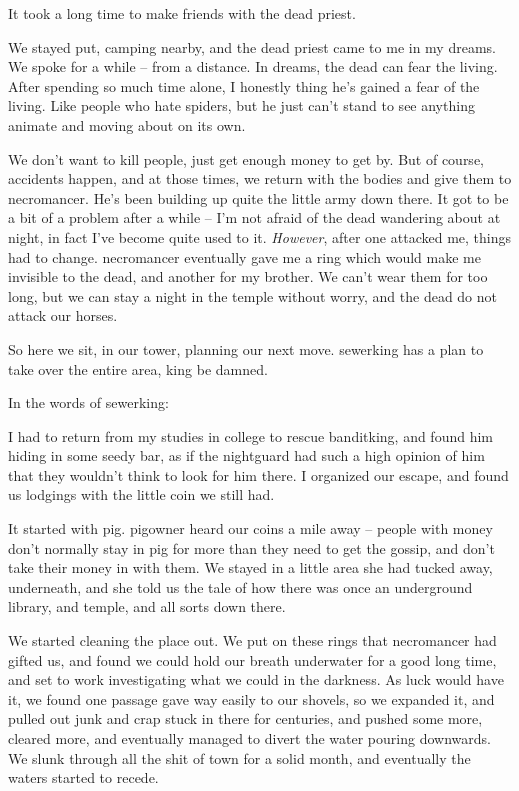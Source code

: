 \begin{multicols}{2}
\begin{exampletext}
  It took a long time to make friends with the dead priest.

  We stayed put, camping nearby, and the dead priest came to me in my dreams.
  We spoke for a while -- from a distance.
  In dreams, the dead can fear the living.
  After spending so much time alone, I honestly thing he's gained a fear of the living.
  Like people who hate spiders, but he just can't stand to see anything animate and moving about on its own.

  We don't want to kill people, just get enough money to get by.
  But of course, accidents happen, and at those times, we return with the bodies and give them to \gls{necromancer}.
  He's been building up quite the little army down there.
  It got to be a bit of a problem after a while -- I'm not afraid of the dead wandering about at night, in fact I've become quite used to it.
  \emph{However}, after one attacked me, things had to change.
  \gls{necromancer} eventually gave me a ring which would make me invisible to the dead, and another for my brother.
  We can't wear them for too long, but we can stay a night in the temple without worry, and the dead do not attack our horses.

  So here we sit, in our tower, planning our next move.
  \gls{sewerking} has a plan to take over the entire area, king be damned.


\end{exampletext}

In the words of \gls{sewerking}:

\begin{exampletext}

  I had to return from my studies in \gls{college} to rescue \gls{banditking}, and found him hiding in some seedy bar, as if the \gls{nightguard} had such a high opinion of him that they wouldn't think to look for him there.
  I organized our escape, and found us lodgings with the little coin we still had.

  It started with \gls{pig}.
  \Gls{pigowner} heard our coins a mile away -- people with money don't normally stay in \gls{pig} for more than they need to get the gossip, and don't take their money in with them.
  We stayed in a little area she had tucked away, underneath, and she told us the tale of how there was once an underground library, and temple, and all sorts down there.

  We started cleaning the place out.
  We put on these rings that \gls{necromancer} had gifted us, and found we could hold our breath underwater for a good long time, and set to work investigating what we could in the darkness.
  As luck would have it, we found one passage gave way easily to our shovels, so we expanded it, and pulled out junk and crap stuck in there for centuries, and pushed some more, cleared more, and eventually managed to divert the water pouring downwards.
  We slunk through all the shit of \gls{town} for a solid month, and eventually the waters started to recede.


\end{exampletext}
\end{multicols}
